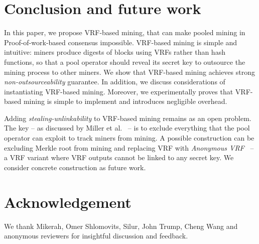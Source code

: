 \section{Conclusion and future work}
\label{sec:conclusion}

In this paper, we propose VRF-based mining, that can make pooled mining in Proof-of-work-based consensus impossible.
VRF-based mining is simple and intuitive: miners produce digests of blocks using VRFs rather than hash functions, so that a pool operator should reveal its secret key to outsource the mining process to other miners.
We show that VRF-based mining achieves strong \emph{non-outsourceability} guarantee.
In addition, we discuss considerations of instantiating VRF-based mining.
Moreover, we experimentally proves that VRF-based mining is simple to implement and introduces negligible overhead.

Adding \emph{stealing-unlinkability} to VRF-based mining remains as an open problem.
The key -- as discussed by Miller et al.~\cite{miller2015nonoutsourceable} -- is to exclude everything that the pool operator can exploit to track miners from mining.
A possible construction can be excluding Merkle root from mining and replacing VRF with \emph{Anonymous VRF}~\cite{ganesh2019proof} -- a VRF variant where VRF outputs cannot be linked to any secret key.
We consider concrete construction as future work.

\section*{Acknowledgement}
We thank Mikerah, Omer Shlomovits, Silur, John Trump, Cheng Wang and anonymous reviewers for insightful discussion and feedback.